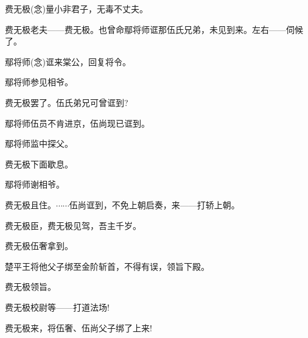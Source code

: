 {

\vspace{5pt}

费无极\hspace{20pt}({\akai 念})量小非君子，无毒不丈夫。

费无极\hspace{20pt}老夫------费无极。也曾命鄢将师诓那伍氏兄弟，未见到来。左右------伺候了。

鄢将师\hspace{20pt}({\akai 念})诓来棠公，回复将令。

鄢将师\hspace{20pt}参见相爷。

费无极\hspace{20pt}罢了。伍氏弟兄可曾诓到?

鄢将师\hspace{20pt}伍员不肯进京，伍尚现已诓到。

鄢将师\hspace{20pt}监中探父。

费无极\hspace{20pt}下面歇息。

鄢将师\hspace{20pt}谢相爷。

费无极\hspace{20pt}且住。$\cdots{}\cdots{}$伍尚诓到，不免上朝启奏，来------打轿上朝。

费无极\hspace{20pt}臣，费无极见驾，吾主千岁。

费无极\hspace{20pt}伍奢拿到。

楚平王\hspace{20pt}将他父子绑至金阶斩首，不得有误，领旨下殿。

费无极\hspace{20pt}领旨。

费无极\hspace{20pt}校尉等------打道法场!

\vspace{5pt}

费无极\hspace{20pt}来，将伍奢、伍尚父子绑了上来!

}
